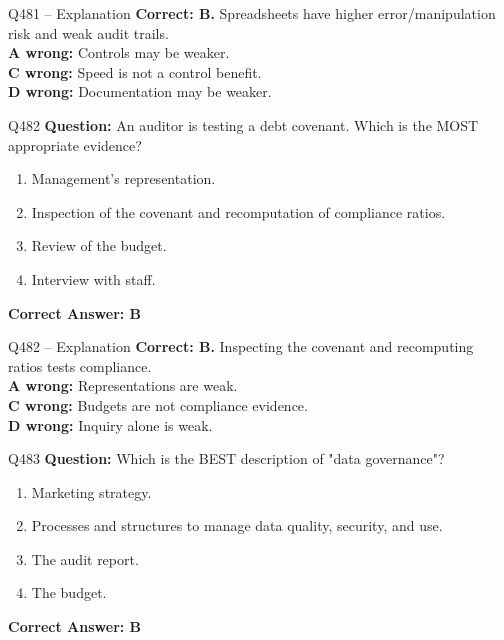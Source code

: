 \documentclass[aspectratio=169,10pt]{beamer}
\begin{document}
	\begin{frame}[t]{Q481 -- Explanation}
		\small
		\textbf{Correct: B.} Spreadsheets have higher error/manipulation risk and weak audit trails. \\[4pt]
		\textbf{A wrong:} Controls may be weaker. \\[2pt]
		\textbf{C wrong:} Speed is not a control benefit. \\[2pt]
		\textbf{D wrong:} Documentation may be weaker.
	\end{frame}
	
	\begin{frame}[t]{Q482}
		\small
		\textbf{Question:} An auditor is testing a debt covenant. Which is the MOST appropriate evidence?
		\begin{enumerate}[label=\Alph*.,itemsep=1pt,topsep=2pt]
			\item Management's representation.
			\item Inspection of the covenant and recomputation of compliance ratios.
			\item Review of the budget.
			\item Interview with staff.
		\end{enumerate}
		\vspace{4pt}
		\textbf{Correct Answer: B}
	\end{frame}
	
	\begin{frame}[t]{Q482 -- Explanation}
		\small
		\textbf{Correct: B.} Inspecting the covenant and recomputing ratios tests compliance. \\[4pt]
		\textbf{A wrong:} Representations are weak. \\[2pt]
		\textbf{C wrong:} Budgets are not compliance evidence. \\[2pt]
		\textbf{D wrong:} Inquiry alone is weak.
	\end{frame}
	
	\begin{frame}[t]{Q483}
		\small
		\textbf{Question:} Which is the BEST description of "data governance"?
		\begin{enumerate}[label=\Alph*.,itemsep=1pt,topsep=2pt]
			\item Marketing strategy.
			\item Processes and structures to manage data quality, security, and use.
			\item The audit report.
			\item The budget.
		\end{enumerate}
		\vspace{4pt}
		\textbf{Correct Answer: B}
	\end{frame}
	
\end{document}
